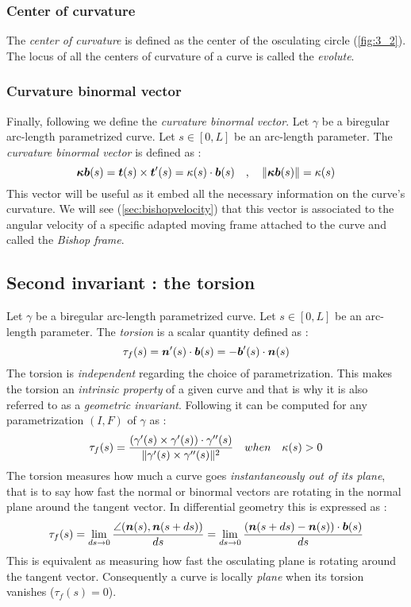 \subsubsection{Center of curvature}
The \emph{center of curvature} is defined as the center of the osculating circle (\cref{fig:3_2}). The locus of all the centers of curvature of a curve is called the \emph{evolute}.

\subsubsection{Curvature binormal vector}
Finally, following \cite{Bergou2008} we define the \emph{curvature binormal vector}. Let $\gamma$ be a biregular arc-length parametrized curve. Let $s\in [0,L]$ be an arc-length parameter. The \emph{curvature binormal vector} is defined as :
\begin{equation}
	\boldsymbol{\kappa b}(s) = \boldsymbol{t}(s) \times \boldsymbol{t}'(s) = \kappa(s)\cdot\boldsymbol{b}(s)
	\quad,\quad
	\lVert\boldsymbol{\kappa b}(s)\rVert= \kappa(s)
\label{eq:kb}
\end{equation}
This vector will be useful as it embed all the necessary information on the curve's curvature. We will see (\cref{sec:bishopvelocity}) that this vector is associated to the angular velocity of a specific adapted moving frame attached to the curve and called the \emph{Bishop frame}.

\subsection{Second invariant : the torsion}\label{sec:torsion}
Let $\gamma$ be a biregular arc-length parametrized curve. Let $s \in [0,L]$ be an arc-length parameter. The \emph{torsion} is a scalar quantity defined as :
\begin{equation}
	\tau_f(s) = \boldsymbol{n}'(s) \cdot \boldsymbol{b}(s) = - \boldsymbol{b}'(s) \cdot \boldsymbol{n}(s)
\end{equation}
The torsion is \emph{independent} regarding the choice of parametrization. This makes the torsion an \emph{intrinsic property} of a given curve and that is why it is also referred to as a \emph{geometric invariant}. Following \cite[p.204]{Gray2006} it can be computed for any parametrization $(I,F)$ of $\gamma$ as :
\begin{equation}
	\tau_f(s) = \frac{(\gamma'(s) \times \gamma'(s)) \cdot \gamma''(s)}{\lVert\gamma'(s) \times \gamma''(s)\rVert^2}
	\quad when \quad
	\kappa(s) > 0
\end{equation}
The torsion measures how much a curve goes \emph{instantaneously out of its plane}, that is to say how fast the normal or binormal vectors are rotating in the normal plane around the tangent vector. In differential geometry this is expressed as :
\begin{equation}
	\tau_f(s) 
	= \lim_{ds \to 0}\frac{\angle(\boldsymbol{n}(s),\boldsymbol{n}(s+ds))}{ds}
	= \lim_{ds \to 0}\frac{(\boldsymbol{n}(s+ds) - \boldsymbol{n}(s)) \cdot \boldsymbol{b}(s)}{ds}
\end{equation}
This is equivalent as measuring how fast the osculating plane is rotating around the tangent vector. Consequently a curve is locally \emph{plane} when its torsion vanishes ($\tau_f(s) = 0$).

